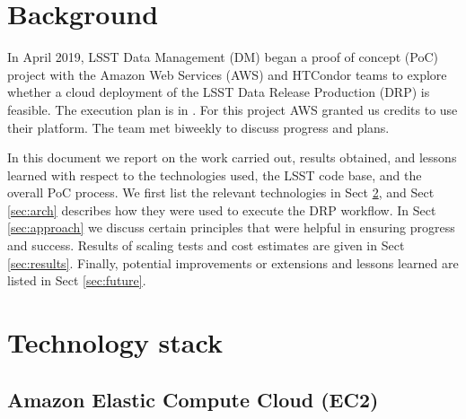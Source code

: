 \newcommand{\poc}{AWS PoC}





\section{Background}

In April 2019, LSST Data Management (DM) began a proof of concept (PoC) project with the Amazon Web Services (AWS) and HTCondor teams to explore whether a cloud deployment of the LSST Data Release Production (DRP) is feasible.
The execution plan is in .
For this project AWS granted us credits to use their platform.
The team met biweekly to discuss progress and plans.

In this document we report on the work carried out, results obtained, and lessons learned with respect to the technologies used, the LSST code base, and the overall PoC process.
We first list the relevant technologies in Sect \ref{sec:tech}, and Sect \ref{sec:arch} describes how they were used to execute the DRP workflow.
In Sect \ref{sec:approach} we discuss certain principles that were helpful in ensuring progress and success.
Results of scaling tests and cost estimates are given in Sect \ref{sec:results}.
Finally, potential improvements or extensions and lessons learned are listed in Sect \ref{sec:future}.

\section{Technology stack} \label{sec:tech}

\subsection{Amazon Elastic Compute Cloud (EC2)}

